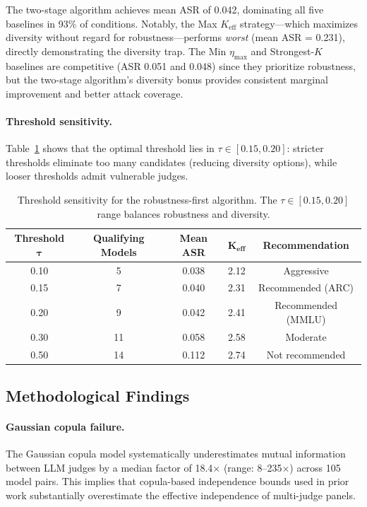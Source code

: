 \documentclass[11pt]{article}
\begin{document}
The two-stage algorithm achieves mean ASR of 0.042, dominating all five baselines in 93\% of conditions. Notably, the Max $K_{\text{eff}}$ strategy---which maximizes diversity without regard for robustness---performs \emph{worst} (mean ASR = 0.231), directly demonstrating the diversity trap. The Min $\eta_{\max}$ and Strongest-$K$ baselines are competitive (ASR 0.051 and 0.048) since they prioritize robustness, but the two-stage algorithm's diversity bonus provides consistent marginal improvement and better attack coverage.

\paragraph{Threshold sensitivity.} Table~\ref{tab:threshold} shows that the optimal threshold lies in $\tau \in [0.15, 0.20]$: stricter thresholds eliminate too many candidates (reducing diversity options), while looser thresholds admit vulnerable judges.

\begin{table}[t]
\centering
\caption{Threshold sensitivity for the robustness-first algorithm. The $\tau \in [0.15, 0.20]$ range balances robustness and diversity.}
\label{tab:threshold}
\small
\begin{tabular}{ccccc}
\toprule
\textbf{Threshold} $\boldsymbol{\tau}$ & \textbf{Qualifying Models} & \textbf{Mean ASR} & $\boldsymbol{K_{\text{eff}}}$ & \textbf{Recommendation} \\
\midrule
0.10 & 5  & 0.038 & 2.12 & Aggressive \\
0.15 & 7  & 0.040 & 2.31 & Recommended (ARC) \\
0.20 & 9  & 0.042 & 2.41 & Recommended (MMLU) \\
0.30 & 11 & 0.058 & 2.58 & Moderate \\
0.50 & 14 & 0.112 & 2.74 & Not recommended \\
\bottomrule
\end{tabular}
\end{table}

\subsection{Methodological Findings}

\paragraph{Gaussian copula failure.} The Gaussian copula model systematically underestimates mutual information between LLM judges by a median factor of 18.4$\times$ (range: 8--235$\times$) across 105 model pairs. This implies that copula-based independence bounds used in prior work substantially overestimate the effective independence of multi-judge panels.
\end{document}
